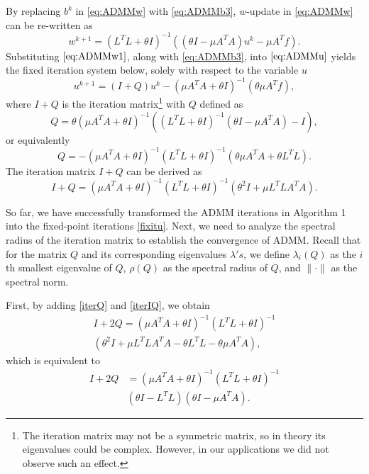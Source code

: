\documentclass[letterpaper]{article} %
\begin{document}
By replacing $b^k$ in \eqref{eq:ADMMw} with \eqref{eq:ADMMb3}, $w$-update in \eqref{eq:ADMMw} can be re-written as
\begin{equation} \label{eq:ADMMw1}
w^{k + 1} = {( { {L^T}L + \theta I})^{ - 1}}( {( {\theta I - \mu{A^T}A}){u^k} - \mu{A^T}f}).
\end{equation}
Substituting $\eqref{eq:ADMMw1}$, along with \eqref{eq:ADMMb3}, into $\eqref{eq:ADMMu}$ yields the fixed iteration system below, solely with respect to the variable $u$
\begin{equation}\label{fixitu}
	u^{k+1} = \left(I+ Q\right) u^{k} - \left(\mu A^T A+\theta I\right)^{-1}\left(\theta \mu A^T f\right),
\end{equation}
where $I+Q$ is the iteration matrix\footnote{The iteration matrix may not be a symmetric matrix, so in theory its eigenvalues could be complex. However, in our applications we did not observe such an effect.} with $Q$ defined as
\begin{equation*}
    Q = \theta (\mu A^T A+\theta I)^{-1} ( ( {L^T}L +\theta I)^{-1} (\theta I -  \mu A^T A ) - I),
\end{equation*}
or equivalently
\begin{equation}\label{iterQ}
    Q = - (\mu A^T A + \theta I)^{-1} (L^T L + \theta I)^{-1} ( \theta \mu A^T A + \theta L^T L).
\end{equation}
The iteration matrix $I+Q$ can be derived as
\begin{equation}\label{iterIQ}
    I+Q = (\mu A^T A + \theta I)^{-1} (L^T L + \theta I)^{-1} ( \theta^2 I + \mu L^T L A^T A).
\end{equation}


So far, we have successfully transformed the ADMM iterations in Algorithm 1 into the fixed-point iterations \eqref{fixitu}. Next, we need to analyze the spectral radius of the iteration matrix to establish the convergence of ADMM. Recall that for the matrix $Q$ and its corresponding eigenvalues $\lambda's$, we define $\lambda_i(Q)$ as the $i$th smallest eigenvalue of $Q$, $\rho(Q)$ as the spectral radius of $Q$, and $\| \cdot \|$ as the spectral norm.


First, by adding \eqref{iterQ} and \eqref{iterIQ}, we obtain
\begin{equation*}
\begin{split}
    I+2Q =  (\mu A^T A + \theta I)^{-1} (L^T L + \theta I)^{-1} \\
   ( \theta^2 I + \mu L^T L A^T A-\theta L^T L - \theta \mu  A^T A),
\end{split}
\end{equation*}
which is equivalent to
\begin{equation*}
\begin{split}
   I+2Q & = (\mu A^T A + \theta I)^{-1} (L^T L + \theta I)^{-1} \\
   & ( \theta I-L^T L)( \theta I-\mu A^T A).
\end{split}
\end{equation*}
\end{document}
